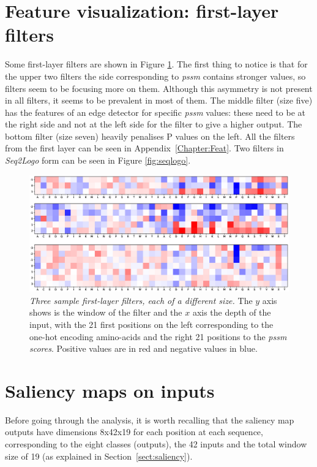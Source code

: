 \section{Feature visualization: first-layer filters}
Some first-layer filters are shown in Figure \ref{fig:filters}. The first thing to notice is that for the upper two filters the side corresponding to \textit{pssm} contains stronger values, so filters seem to be focusing more on them. Although this asymmetry is not present in all filters, it seems to be prevalent in most of them. The middle filter (size five) has the features of an edge detector for specific \textit{pssm} values: these need to be at the right side and not at the left side for the filter to give a higher output. The bottom filter (size seven) heavily penalises P values on the left. All the filters from the first layer can be seen in Appendix~\ref{Chapter:Feat}. Two filters in \textit{Seq2Logo} form can be seen in Figure \ref{fig:seqlogo}.

\begin{figure}
	\centering
	\includegraphics[width=1\linewidth]{Figures/filters}
	\caption{\textit{Three sample first-layer filters, each of a different size.} The $y$ axis shows is the window of the filter and the $x$ axis the depth of the input, with the 21 first positions on the left corresponding to the one-hot encoding amino-acids and the right 21 positions to the \textit{pssm scores}. Positive values are in red and negative values in blue.}
	\label{fig:filters}
\end{figure}


\section{Saliency maps on inputs}

Before going through the analysis, it is worth recalling that the saliency map outputs have dimensions 8x42x19 for each position at each sequence, corresponding to the eight classes (outputs), the 42 inputs and the total window size of 19 (as explained in Section~\ref{sect:saliency}).

